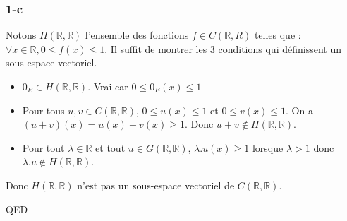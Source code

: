 \documentclass[]{book}
\theoremstyle{definition}
\newcommand{\bb}[1]{\mathbb{#1}}
\newcommand{\R}{\bb{R}}
\begin{document}
\subsubsection*{1-c}
Notons $H(\R,\R)$ l'ensemble des fonctions $f \in C(\R,R)$ telles que : $\forall x \in \R, 0 \leq f(x) \leq 1$.
Il suffit de montrer les 3 conditions qui d\'efinissent un sous-espace vectoriel.
\begin{itemize}
\item $0_E \in H(\R,\R)$. Vrai car $0 \leq 0_E(x) \leq 1$
\item Pour tous $u, v \in C(\R,\R)$, $0 \leq u(x) \leq 1$ et $0 \leq v(x) \leq 1$. On a $(u+v)(x) = u(x) + v(x) \geq 1$. Donc  $u+v \notin H(\R,\R)$.
\item Pour tout $\lambda \in \R$ et tout $u \in G(\R,\R)$, $\lambda.u(x) \geq 1$ lorsque $\lambda > 1$ donc $\lambda.u \notin H(\R,\R)$.
\end{itemize}
Donc $H(\R,\R)$ n'est pas un sous-espace vectoriel de $C(\R,\R)$.

QED
\end{document}
